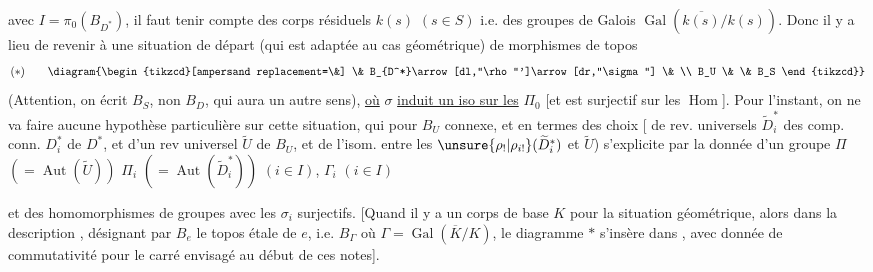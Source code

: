 avec $I=\pi_0(B_{D^*})$, il faut tenir compte des corps résiduels $k(s)$ $(s\in S)$ i.e. des groupes de Galois $\operatorname{Gal}(\overline{k(s)}/k(s))$. Donc il y a lieu de revenir à une situation de départ (qui est adaptée au cas géométrique) de morphismes de topos 
\[
 (*)\qquad
 \diagram{\begin{tikzcd}[ampersand replacement=\&]
 \& B_{D^*}\arrow[dl,"\rho"']\arrow[dr,"\sigma"] \& \\
 B_U \& \& B_S
 \end{tikzcd}}
\]
(Attention, on écrit $B_S$, non $B_D$, qui aura un autre sens), \uline{où} $\sigma$ \uline{induit un iso sur les} $\Pi_0$ [et est surjectif sur les $\operatorname{Hom}$]. Pour l'instant, on ne va faire aucune hypothèse particulière sur cette situation, qui pour $B_U$ connexe, et en termes des choix
[ de rev. universels $\widetilde D_i^*$ des comp. conn. $D_i^*$ de $D^*$, et d'un rev universel $\widetilde U$ de $B_U$, et de l'isom. entre les $\unsure{\rho_!|\rho_{i!}}(\widetilde D_i^*)$ et $\widetilde U$) s'explicite par la donnée d'un groupe $\Pi$ $(=\operatorname{Aut}(\widetilde U))$   $\Pi_i$ $(=\operatorname{Aut}(\widetilde D_i^*))$  $(i\in I)$, $\Gamma_i$ $(i\in I)$


et des homomorphismes de groupes
avec les $\sigma_i$ surjectifs. 
[Quand il y a un corps de base $K$ pour la situation géométrique, alors dans la description ,  désignant par $B_e$ le topos étale  de $e$, i.e. $B_\Gamma$ où $\Gamma=\operatorname{Gal}(\overline K/K)$, le diagramme $*$ s'insère dans
,
avec donnée de commutativité pour le carré envisagé au début de ces notes].

